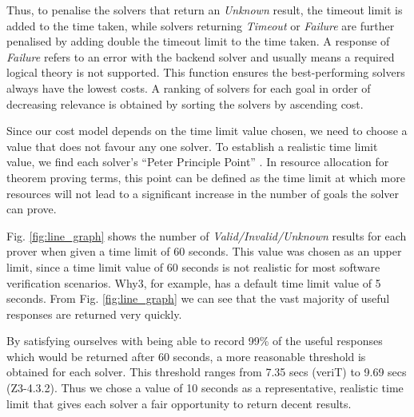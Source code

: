 \documentclass[runningheads,a4paper]{llncs}
\begin{document}
Thus, to penalise the solvers that return an \textit{Unknown} result, the timeout limit is added to the time taken, while solvers returning \textit{Timeout} or \textit{Failure} are further penalised by 
adding double the timeout limit to the time taken.
A response of \textit{Failure} refers to an error with the backend solver and usually means a required logical theory is not supported. 
This function ensures the best-performing solvers always have the lowest costs. A ranking of solvers for each goal in order of decreasing relevance is obtained by sorting the solvers by ascending cost.

Since our cost model depends on the time limit value chosen, we need to choose a value that does not favour any one solver.  To establish a realistic time limit value, we find each solver's ``Peter Principle Point'' \cite{Sutcliffe200139}. In resource allocation for theorem proving terms, this point can be defined as the time limit at which more resources will not lead to a significant increase in the number of goals the solver can prove. 

Fig. \ref{fig:line_graph} shows the number of \textit{Valid/Invalid/Unknown} results for each prover when given a time limit of 60 seconds. 
This value was chosen as an upper limit, since a time limit value of 60 seconds is not realistic for most software verification scenarios.  \textsf{Why3}, for example, has a default time limit value of 5 seconds. 
From Fig. \ref{fig:line_graph} we can see that the vast majority of useful responses are returned very quickly. 

By satisfying ourselves with being able to record 99\% of the useful responses which would be returned after 60 seconds, a more reasonable threshold is obtained for each solver. This threshold ranges from 7.35 secs (veriT) to 9.69 secs (Z3-4.3.2). Thus we chose a value of 10 seconds as a representative, realistic time limit that gives each solver a fair opportunity to return decent results.     
\end{document}
